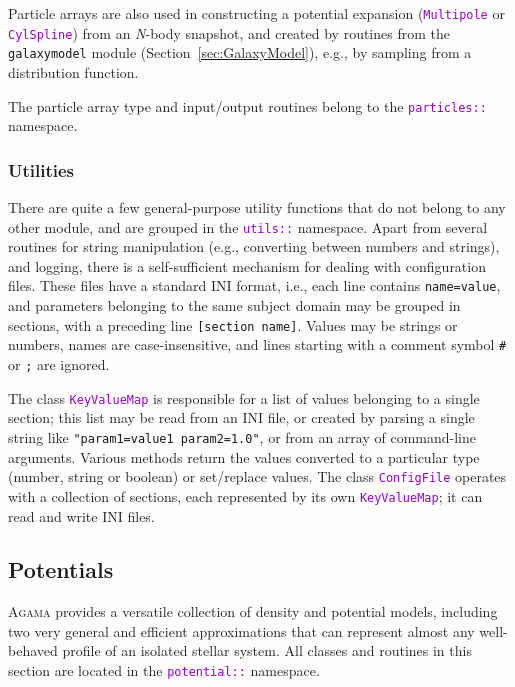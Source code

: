\documentclass[12pt]{article}
\newcommand{\Agama}{\textsc{Agama}\xspace}
\newcommand{\Nbody}{\textsl{N}-body\xspace}
\newcommand{\ttt}[1]{\textcolor{darkviolet}{\texttt{#1}}}
\newcommand{\ppp}[1]{\textcolor{darkolive} {\texttt{#1}}}
\begin{document}
Particle arrays are also used in constructing a potential expansion (\ttt{Multipole} or \ttt{CylSpline}) from an \Nbody snapshot, and created by routines from the \texttt{galaxymodel} module (Section~\ref{sec:GalaxyModel}), e.g., by sampling from a distribution function.

The particle array type and input/output routines belong to the \ttt{particles::} name\-space.

\subsubsection{Utilities}  \label{sec:Utilities}

There are quite a few general-purpose utility functions that do not belong to any other module, and are grouped in the \ttt{utils::} namespace. 
Apart from several routines for string manipulation (e.g., converting between numbers and strings), and logging, there is a self-sufficient mechanism for dealing with configuration files. These files have a standard INI format, i.e., each line contains \ppp{name=value}, and parameters belonging to the same subject domain may be grouped in sections, with a preceding line \ppp{[section name]}. Values may be strings or numbers, names are case-insensitive, and lines starting with a comment symbol \texttt{\#} or \texttt{;} are ignored.

The class \ttt{KeyValueMap} is responsible for a list of values belonging to a single section; this list may be read from an INI file, or created by parsing a single string like \ppp{"param1=value1 param2=1.0"}, or from an array of command-line arguments. Various methods return the values converted to a particular type (number, string or boolean) or set/replace values.
The class \ttt{ConfigFile} operates with a collection of sections, each represented by its own \ttt{KeyValueMap}; it can read and write INI files.


\subsection{Potentials}  \label{sec:Potential}

\Agama provides a versatile collection of density and potential models, including two very general and efficient approximations that can represent almost any well-behaved profile of an isolated stellar system. All classes and routines in this section are located in the \ttt{potential::} namespace.
\end{document}

